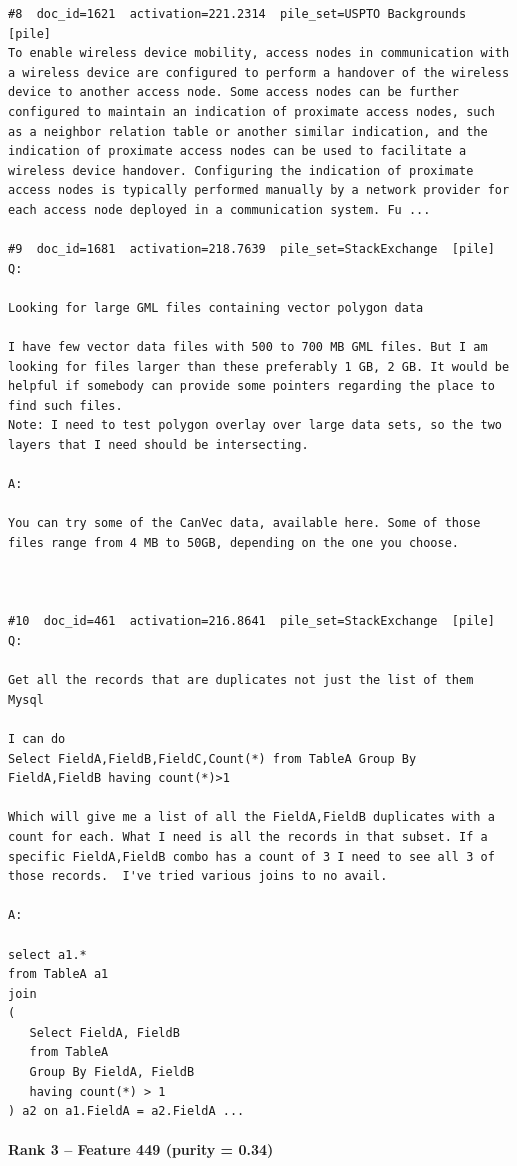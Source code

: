 \begin{verbatim}
#8  doc_id=1621  activation=221.2314  pile_set=USPTO Backgrounds  [pile]
To enable wireless device mobility, access nodes in communication with a wireless device are configured to perform a handover of the wireless device to another access node. Some access nodes can be further configured to maintain an indication of proximate access nodes, such as a neighbor relation table or another similar indication, and the indication of proximate access nodes can be used to facilitate a wireless device handover. Configuring the indication of proximate access nodes is typically performed manually by a network provider for each access node deployed in a communication system. Fu ...

#9  doc_id=1681  activation=218.7639  pile_set=StackExchange  [pile]
Q:

Looking for large GML files containing vector polygon data

I have few vector data files with 500 to 700 MB GML files. But I am looking for files larger than these preferably 1 GB, 2 GB. It would be helpful if somebody can provide some pointers regarding the place to find such files.
Note: I need to test polygon overlay over large data sets, so the two layers that I need should be intersecting.

A:

You can try some of the CanVec data, available here. Some of those files range from 4 MB to 50GB, depending on the one you choose.



#10  doc_id=461  activation=216.8641  pile_set=StackExchange  [pile]
Q:

Get all the records that are duplicates not just the list of them Mysql

I can do
Select FieldA,FieldB,FieldC,Count(*) from TableA Group By FieldA,FieldB having count(*)>1

Which will give me a list of all the FieldA,FieldB duplicates with a count for each. What I need is all the records in that subset. If a specific FieldA,FieldB combo has a count of 3 I need to see all 3 of those records.  I've tried various joins to no avail.

A:

select a1.* 
from TableA a1
join
(
   Select FieldA, FieldB
   from TableA 
   Group By FieldA, FieldB 
   having count(*) > 1
) a2 on a1.FieldA = a2.FieldA ...

\end{verbatim}

\paragraph*{Rank 3 -- Feature 449 (purity = 0.34)}

